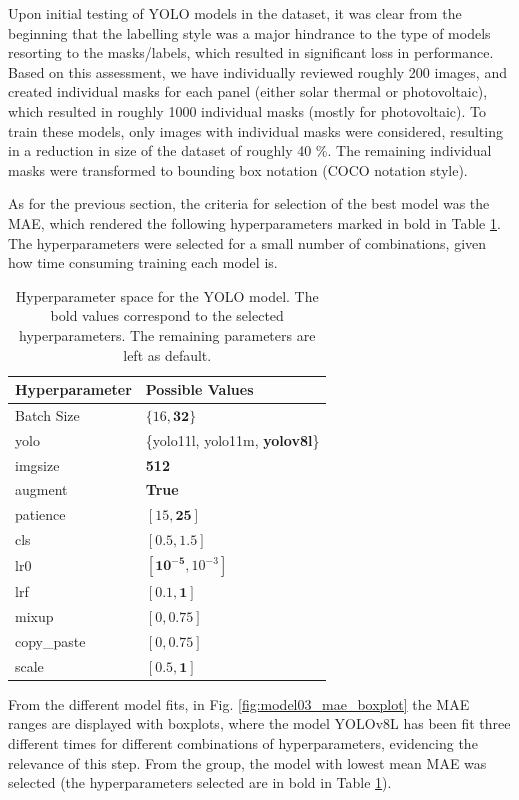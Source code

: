 \documentclass[conference]{IEEEtran}
\begin{document}
Upon initial testing of YOLO models in the dataset, it was clear from the beginning that the labelling style was a major hindrance to the type of models resorting to the masks/labels, which resulted in significant loss in performance. Based on this assessment, we have individually reviewed roughly 200 images, and created individual masks for each panel (either solar thermal or photovoltaic), which resulted in roughly 1000 individual masks (mostly for photovoltaic). To train these models, only images with individual masks were considered, resulting in a reduction in size of the dataset of roughly 40 \%. The remaining individual masks were transformed to bounding box notation (COCO notation style).

As for the previous section, the criteria for selection of the best model was the MAE, which rendered the following hyperparameters marked in bold in Table \ref{parametrosobjid}. The hyperparameters were selected for a small number of combinations, given how time consuming training each model is.

\begin{table}[H]
\centering
\caption{Hyperparameter space for the YOLO model. The bold values correspond to the selected hyperparameters. The remaining parameters are left as default.}
\label{parametrosobjid}
\begin{tabular}{ll}
\toprule
\textbf{Hyperparameter} & \textbf{Possible Values} \\
\midrule
Batch Size & $\{16, \mathbf{32}\}$ \\
yolo & \{yolo11l, yolo11m, \textbf{yolov8l}\} \\
imgsize & \textbf{512} \\
augment & \textbf{True} \\
patience & $[15, \mathbf{25}]$ \\
cls & $[0.5, \mathbf{1.5}]$ \\
lr0 & $[\mathbf{10^{-5}}, 10^{-3}]$ \\
lrf & $[0.1, \mathbf{1}]$ \\
mixup & $[0, \mathbf{0.75}]$ \\
copy\_paste & $[0, \mathbf{0.75}]$ \\
scale & $[0.5, \mathbf{1}]$ \\
\bottomrule
\end{tabular}
\end{table}

From the different model fits, in Fig. \ref{fig:model03_mae_boxplot} the MAE ranges are displayed with boxplots, where the model YOLOv8L has been fit three different times for different combinations of hyperparameters, evidencing the relevance of this step. From the group, the model with lowest mean MAE was selected (the hyperparameters selected are in bold in Table \ref{parametrosobjid}).
\end{document}

